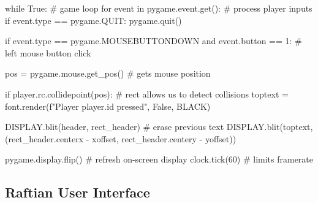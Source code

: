 \begin{python}[label={code:pygameLoop}, caption={All interactions and frame-by-frame rendering happen in the game loop}]
while True: # game loop
    for event in pygame.event.get():    # process player inputs
        if event.type == pygame.QUIT:
            pygame.quit()

        if event.type == pygame.MOUSEBUTTONDOWN and event.button == 1:  # left mouse button click

            pos = pygame.mouse.get_pos() # gets mouse position

            if player.rc.collidepoint(pos): # rect allows us to detect collisions
                toptext = font.render(f"Player {player.id} pressed", False, BLACK)

                DISPLAY.blit(header, rect_header)   # erase previous text
                DISPLAY.blit(toptext, (rect_header.centerx - xoffset, rect_header.centery - yoffset))

    pygame.display.flip()  # refresh on-screen display
    clock.tick(60)         # limits framerate
\end{python}

\subsection{Raftian User Interface}